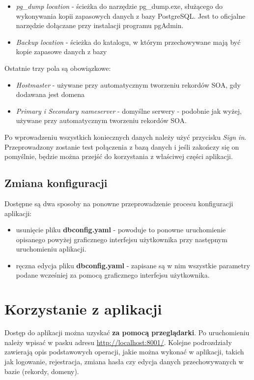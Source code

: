 \documentclass[12pt] {article}
\begin{document}
\begin{itemize}
\item \emph{pg\_dump location} - ścieżka do narzędzie pg\_dump.exe, służącego do wykonywania kopii zapasowych danych z bazy PostgreSQL. Jest to oficjalne narzędzie dołączane przy instalacji programu pgAdmin.
\item \emph{Backup location} - ścieżka do katalogu, w którym przechowywane mają być kopie zapasowe danych z bazy
\end{itemize}
Ostatnie trzy pola są obowiązkowe:
\begin{itemize}
\item \emph{Hostmaster} - używane przy automatycznym tworzeniu rekordów SOA, gdy dodawana jest domena
\item \emph{Primary i Secondary nameserver} - domyślne serwery - podobnie jak wyżej, używane przy automatycznym tworzeniu rekordów SOA.
\end{itemize}
Po wprowadzeniu wszystkich koniecznych danych należy użyć przycisku \emph{Sign in}. Przeprowadzony zostanie test połączenia z bazą danych i jeśli zakończy się on pomyślnie, będzie można przejść do korzystania z właściwej części aplikacji.

\subsection{Zmiana konfiguracji}
Dostępne są dwa sposoby na ponowne przeprowadzenie procesu konfiguracji aplikacji:
\begin{itemize}
\item usunięcie pliku \textbf{dbconfig.yaml} - powoduje to ponowne uruchomienie opisanego powyżej graficznego interfejsu użytkownika przy następnym uruchomieniu aplikacji.
\item ręczna edycja pliku \textbf{dbconfig.yaml} - zapisane są w nim wszystkie parametry podane wcześniej za pomocą graficznego interfejsu użytkownika.
\end{itemize}
\newpage

\section{Korzystanie z aplikacji}
\label{webapp}
Dostęp do aplikacji można uzyskać \textbf{za pomocą przeglądarki}. Po uruchomieniu należy wpisać w pasku adresu \url{http://localhost:8001/}. \newline
Kolejne podrozdziały zawierają opis podstawowych operacji, jakie można wykonać w aplikacji, takich jak logowanie, rejestracja, zmiana hasła czy edycja danych przechowywanych w bazie (rekordy, domeny).
\end{document}
